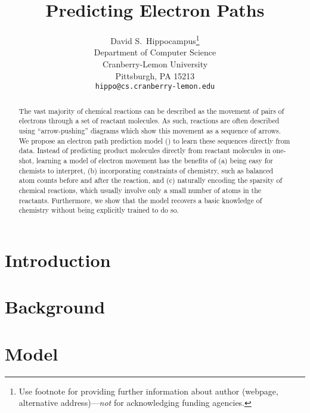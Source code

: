 \documentclass{article}
\title{Predicting Electron Paths}
\author{
  David S.~Hippocampus\thanks{Use footnote for providing further
    information about author (webpage, alternative
    address)---\emph{not} for acknowledging funding agencies.} \\
  Department of Computer Science\\
  Cranberry-Lemon University\\
  Pittsburgh, PA 15213 \\
  \texttt{hippo@cs.cranberry-lemon.edu} \\
}
\begin{document}

\maketitle

\begin{abstract}
The vast majority of chemical reactions can be described as the movement of pairs of electrons through a set of reactant molecules. 
As such, reactions are often described using ``arrow-pushing'' diagrams which show this movement as a sequence of arrows. 
We propose an electron path prediction model (\ourModel) to learn these sequences directly from data.
Instead of predicting product molecules directly from reactant molecules in one-shot, learning a model of electron movement has the benefits of 
(a) being easy for chemists to interpret, 
(b) incorporating constraints of chemistry, such as balanced atom counts before and after the reaction, and 
(c) naturally encoding the sparsity of chemical reactions, which usually involve only a small number of atoms in the reactants.
Furthermore, we show that the model recovers a basic knowledge of chemistry without being explicitly trained to do so.
\end{abstract}


\section{Introduction}



\vspace{-0.5em}
\section{Background}
\vspace{-0.5em}





\vspace{-0.5em}
\section{Model}
\vspace{-0.5em}
\label{sec:model}









\end{document}
